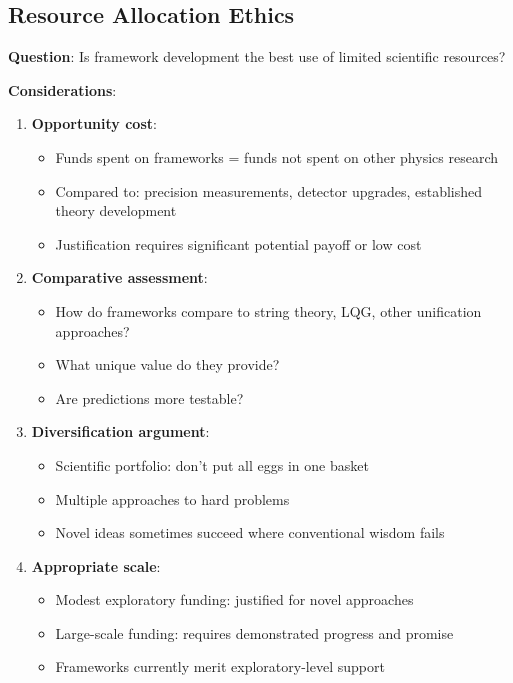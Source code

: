 \subsection{Resource Allocation Ethics}

\textbf{Question}: Is framework development the best use of limited scientific resources?

\textbf{Considerations}:

\begin{enumerate}
    \item \textbf{Opportunity cost}:
    \begin{itemize}
        \item Funds spent on frameworks = funds not spent on other physics research
        \item Compared to: precision measurements, detector upgrades, established theory development
        \item Justification requires significant potential payoff or low cost
    \end{itemize}

    \item \textbf{Comparative assessment}:
    \begin{itemize}
        \item How do frameworks compare to string theory, LQG, other unification approaches?
        \item What unique value do they provide?
        \item Are predictions more testable?
    \end{itemize}

    \item \textbf{Diversification argument}:
    \begin{itemize}
        \item Scientific portfolio: don't put all eggs in one basket
        \item Multiple approaches to hard problems
        \item Novel ideas sometimes succeed where conventional wisdom fails
    \end{itemize}

    \item \textbf{Appropriate scale}:
    \begin{itemize}
        \item Modest exploratory funding: justified for novel approaches
        \item Large-scale funding: requires demonstrated progress and promise
        \item Frameworks currently merit exploratory-level support
    \end{itemize}
\end{enumerate}

